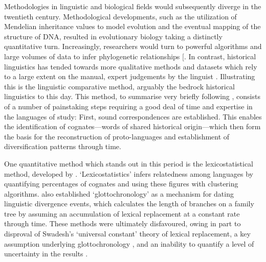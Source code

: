 Methodologies in linguistic and biological fields would subsequently diverge in the twentieth century. Methodological developments, such as the utilization of Mendelian inheritance values to model evolution and the eventual mapping of the structure of DNA, resulted in evolutionary biology taking a distinctly quantitative turn. Increasingly, researchers would turn to powerful algorithms and large volumes of data to infer phylogenetic relationships {[}\textcite{atkinson_cuious_2005}. In contrast, historical linguistics has tended towards more qualitative methods and datasets which rely to a large extent on the manual, expert judgements by the linguist \autocite{nunn_comparative_2011}. Illustrating this is the linguistic comparative method, arguably the bedrock historical linguistics to this day. This method, to summarise very briefly following \textcite{thomason_language_1992}, consists of a number of painstaking steps requiring a good deal of time and expertise in the languages of study: First, sound correspondences are established. This enables the identification of cognates---words of shared historical origin---which then form the basis for the reconstruction of proto-languages and establishment of diversification patterns through time.

One quantitative method which stands out in this period is the lexicostatistical method, developed by \textcite{swadesh_lexico-statistic_1952}. `Lexicostatistics' infers relatedness among languages by quantifying percentages of cognates and using these figures with clustering algorithms. \textcite{swadesh_towards_1955} also established `glottochronology' as a mechanism for dating linguistic divergence events, which calculates the length of branches on a family tree by assuming an accumulation of lexical replacement at a constant rate through time. These methods were ultimately disfavoured, owing in part to disproval of Swadesh's `universal constant' theory of lexical replacement, a key assumption underlying glottochronology \autocite{blust_why_2000}, and an inability to quantify a level of uncertainty in the results \autocite{atkinson_curious_2005}.

